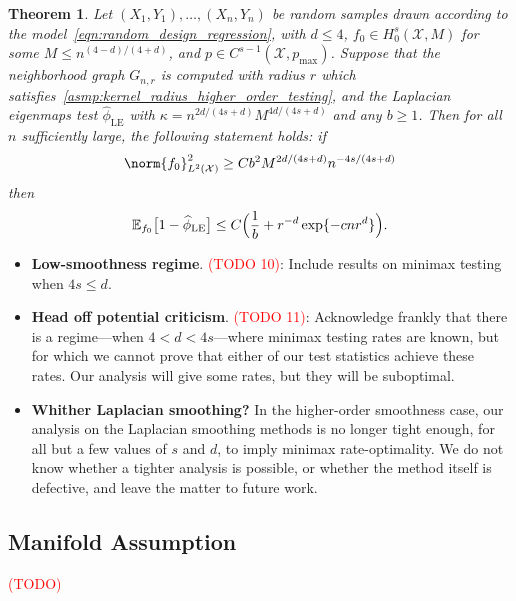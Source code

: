 \documentclass{article}
\newcommand{\1}{\mathbf{1}}
\newcommand{\Xset}{\mathcal{X}}
\newcommand{\Leb}{L}
\newcommand{\Ebb}{\mathbb{E}}
\newcommand{\wh}[1]{\widehat{#1}}
\newcommand{\LE}{\mathrm{LE}}
\theoremstyle{alden}
\theoremstyle{aldenthm}
\newtheorem{theorem}{Theorem}
\theoremstyle{definition}
\theoremstyle{remark}
\begin{document}
\begin{theorem}
	\label{thm:laplacian_eigenmaps_testing_higher_order}
	Let $(X_1,Y_1),\ldots,(X_n,Y_n)$ be random samples drawn according to the model~\eqref{eqn:random_design_regression}, with $d \leq 4$, $f_0 \in H_0^s(\Xset,M)$ for some $M \leq n^{(4 - d)/(4 + d)}$, and $p \in C^{s - 1}(\Xset,p_{\max})$. Suppose that the neighborhood graph $G_{n,r}$ is computed with radius $r$ which satisfies~\ref{asmp:kernel_radius_higher_order_testing}, and the Laplacian eigenmaps test $\wh{\phi}_{\LE}$ with $\kappa = n^{2d/(4s + d)} M^{4d/(4s + d)}$ and any $b \geq 1$. Then for all $n$ sufficiently large, the following statement holds: if
	\begin{equation}
	\label{eqn:laplacian_eigenmaps_testing}
	\norm{f_0}_{\Leb^2(\Xset)}^2 \geq C b^2 M^{2d/(4s + d)} n^{-4s/(4s + d)}
	\end{equation}
	then
	\begin{equation*}
	\Ebb_{f_0}\bigl[1 - \wh{\phi}_{\LE}\bigr] \leq C \Bigl(\frac{1}{b} + r^{-d} \exp\{- c n r^d\}\Bigr).
	\end{equation*}
\end{theorem}

\begin{itemize}
	\item \textbf{Low-smoothness regime}. \textcolor{red}{(TODO 10)}: Include results on minimax testing when $4s \leq d$.
	\item \textbf{Head off potential criticism}. \textcolor{red}{(TODO 11)}: Acknowledge frankly that there is a regime---when $4 < d < 4s$---where minimax testing rates are known, but for which we cannot prove that either of our test statistics achieve these rates. Our analysis will give some rates, but they will be suboptimal.
	\item \textbf{Whither Laplacian smoothing?} In the higher-order smoothness case, our analysis on the Laplacian smoothing methods is no longer tight enough, for all but a few values of $s$ and $d$, to imply minimax rate-optimality. We do not know whether a tighter analysis is possible, or whether the method itself is defective, and leave the matter to future work.
\end{itemize}

\subsection{Manifold Assumption}
\label{subsec:manifold_assumption}

\textcolor{red}{(TODO)}
\end{document}
